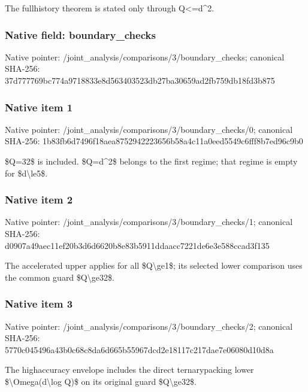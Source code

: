 \documentclass[10pt,a4paper]{article}
\begin{document}
The fullhistory theorem is stated only through Q<=d\textasciicircum{}2.


\subsubsection{Native field: boundary\_checks}


Native pointer: /joint\_analysis/comparis\allowbreak{}ons/3/boundary\_checks; canonical SHA-256: 37d777769bc774a9718833e8\allowbreak{}d563403523db27ba30659ad2\allowbreak{}fb759db18fd3b875



\subsubsection{Native item 1}


Native pointer: /joint\_analysis/comparis\allowbreak{}ons/3/boundary\_checks/0; canonical SHA-256: 1b83fb6d7496f18aea875294\allowbreak{}2223656b58a4c11a0eed5549\allowbreak{}c6fff8b7ed96c9b0


\$Q=32\$ is included. \$Q=d\textasciicircum{}2\$ belongs to the first regime; that regime is empty for \$d\textbackslash{}le5\$.


\subsubsection{Native item 2}


Native pointer: /joint\_analysis/comparis\allowbreak{}ons/3/boundary\_checks/1; canonical SHA-256: d0907a49aec11ef20b3d6d66\allowbreak{}20b8e83b5911ddaacc7221de\allowbreak{}6e3e588ccad3f135


The accelerated upper applies for all \$Q\textbackslash{}ge1\$; its selected lower comparison uses the common guard \$Q\textbackslash{}ge32\$.


\subsubsection{Native item 3}


Native pointer: /joint\_analysis/comparis\allowbreak{}ons/3/boundary\_checks/2; canonical SHA-256: 5770c045496a43b0c68c8da6\allowbreak{}d665b55967dcd2e18117c217\allowbreak{}dae7e06080d10d8a


The highaccuracy envelope includes the direct ternarypacking lower \$\textbackslash{}Omega(d\textbackslash{}log Q)\$ on its original guard \$Q\textbackslash{}ge32\$.
\end{document}
